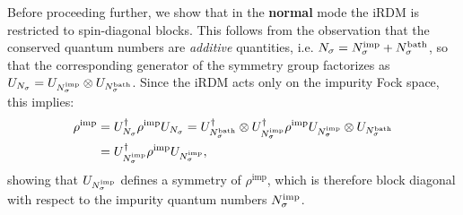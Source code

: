 \documentclass[edipack_sp.tex]{subfiles}
\begin{document}
Before proceeding further, we show that in the {\bf normal} mode the iRDM is restricted to 
{spin-diagonal} blocks. This follows from the observation 
that the conserved quantum numbers are 
{\it additive} quantities, i.e. 
$N_\sigma = N_\sigma^\mathrm{imp} + N_\sigma^\mathrm{bath}$,
so that the corresponding generator of the symmetry group factorizes as
$U_{N_\sigma} = U_{N_\sigma^\mathrm{imp}} \otimes U_{N_\sigma^\mathrm{bath}}$. 
Since the iRDM acts only on the impurity Fock space, this implies:
\begin{equation}
\begin{aligned}
\rho^\mathrm{imp} &= U_{N_\sigma}^\dagger \rho^\mathrm{imp} U_{N_\sigma} = 
U_{N_\sigma^\mathrm{bath}}^\dagger \otimes U_{N_\sigma^\mathrm{imp}}^\dagger 
\rho^\mathrm{imp} 
U_{N_\sigma^\mathrm{imp}} \otimes U_{N_\sigma^\mathrm{bath}} \\
&= 
U_{N_\sigma^\mathrm{imp}}^\dagger \rho^\mathrm{imp} U_{N_\sigma^\mathrm{imp}},
\end{aligned}
\end{equation}
showing that $U_{N_\sigma^\mathrm{imp}}$ defines a symmetry of 
$\rho^\mathrm{imp}$, which is therefore block diagonal with respect to 
the impurity quantum numbers $N_\sigma^\mathrm{imp}$.
\end{document}
